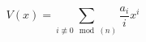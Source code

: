 \begin{equation}\label{eq:potentialmissn}
V(x) = \sum_{i\not\equiv0\mod(n)} \frac{a_i}{i} x^i
\end{equation}

